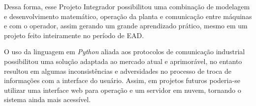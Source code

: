\documentclass[
	article,			%
	11pt,				%
	oneside,			%
	a4paper,			%
	section=TITLE,		%
	english,			%
	brazil,				%
	sumario=tradicional
	]{abntex2}
\newcommand{\Py}{\textit{Python}}%
\begin{document}
Dessa forma, esse Projeto Integrador possibilitou uma combinação de modelagem e desenvolvimento matemático, operação da planta e comunicação entre máquinas e com o operador, assim gerando um grande aprendizado prático, mesmo em um projeto feito inteiramente no período de EAD. 

O uso da linguagem em \Py{} aliada aos protocolos de comunicação industrial possibilitou uma solução adaptada ao mercado atual e aprimorável, no entanto resultou em algumas inconsistências e adversidades no processo de troca de informações com a interface do usuário. Assim, em projetos futuros poderia-se utilizar uma interface web para operação e um servidor em nuvem, tornando o sistema ainda mais acessível. 

\newpage
\end{document}
